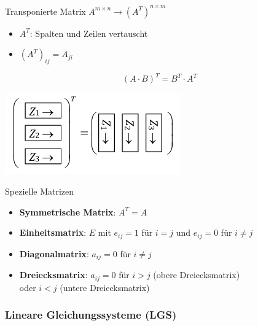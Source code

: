     \begin{minipage}{0.65\linewidth}
        \begin{definition}{Transponierte Matrix} $A^{m \times n} \rightarrow (A^T)^{n \times m}$
            \begin{itemize}
                \item $A^T$: Spalten und Zeilen vertauscht
                \item $(A^T)_{ij} = A_{ji}$
            \end{itemize}
            \vspace{2mm}
            $${(A\cdot B)}^T = B^T\cdot A^T$$
        \end{definition}
    \end{minipage}
    \begin{minipage}{0.35\linewidth}
        \includegraphics[width=1\linewidth]{images/mat-transpos.png}
    \end{minipage}

    \begin{KR}{Spezielle Matrizen}
        \begin{itemize}
            \item \textbf{Symmetrische Matrix}: $A^T = A$
            \item \textbf{Einheitsmatrix}: $E$ mit $e_{ij} = 1$ für $i = j$ und $e_{ij} = 0$ für $i \neq j$
            \item \textbf{Diagonalmatrix}: $a_{ij} = 0$ für $i \neq j$
            \item \textbf{Dreiecksmatrix}: $a_{ij} = 0$ für $i > j$ (obere Dreiecksmatrix) \\oder $i < j$ (untere Dreiecksmatrix)
        \end{itemize}
    \end{KR}

\raggedcolumns
\columnbreak

\subsubsection*{Lineare Gleichungssysteme (LGS)}
    
